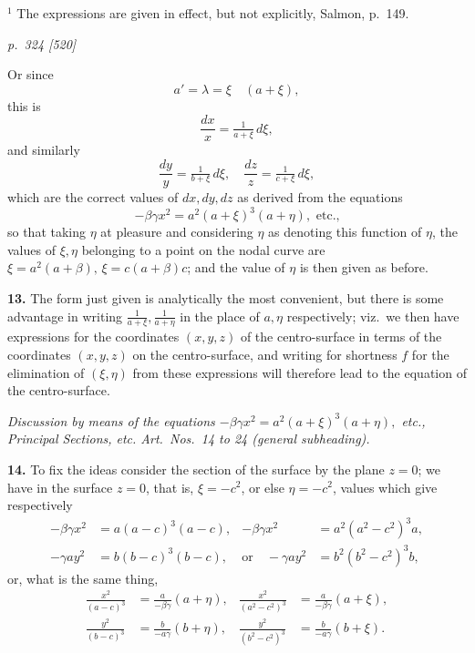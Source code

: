 \documentclass[11pt,a4paper]{article}
\theoremstyle{plain}
\theoremstyle{definition}
\begin{document}
\smallskip
\footnotesize
$^1$ The expressions are given in effect, but not explicitly, Salmon, p.~149.

\clearpage

\bigskip
\textit{p.~324 [520]}
\smallskip

Or since
\[
a' = \lambda = \xi\quad(a + \xi),
\]
this is
\[
\frac{dx}{x} = \tfrac{1}{a + \xi}\,d\xi,
\]
and similarly
\[
\frac{dy}{y} = \tfrac{1}{b + \xi}\,d\xi,\quad
\frac{dz}{z} = \tfrac{1}{c + \xi}\,d\xi,
\]
which are the correct values of $dx, dy, dz$ as derived from the equations
\[
-\beta\gamma x^2 = a^2(a + \xi)^3(a + \eta), \text{ etc.,}
\]
so that taking $\eta$ at pleasure and considering $\eta$ as denoting this function of $\eta$, the values of $\xi, \eta$ belonging to a point on the nodal curve are $\xi = a^2(a + \beta), \, \xi = c(a + \beta) c$; and the value of $\eta$ is then given as before.

\textbf{13.} The form just given is analytically the most convenient, but there is some advantage in writing $\tfrac{1}{a + \xi}, \tfrac{1}{a + \eta}$ in the place of $a, \eta$ respectively; viz.\ we then have expressions for the coordinates $(x, y, z)$ of the centro-surface in terms of the coordinates $(x, y, z)$ on the centro-surface, and writing for shortness $f$ for the elimination of $(\xi, \eta)$ from these expressions will therefore lead to the equation of the centro-surface.

\textit{Discussion by means of the equations $-\beta\gamma x^2 = a^2(a + \xi)^3(a + \eta),$ etc., Principal Sections, etc. Art.\ Nos.\ 14 to 24 (general subheading).}

\textbf{14.} To fix the ideas consider the section of the surface by the plane $z = 0$; we have in the surface $z = 0$, that is, $\xi = -c^2$, or else $\eta = -c^2$, values which give respectively
\begin{align*}
-\beta\gamma x^2 &= a(a - c)^3(a - c), & -\beta\gamma x^2 &= a^2(a^2 - c^2)^3 a,\\
-\gamma a y^2 &= b(b - c)^3(b - c), & \text{or}\quad -\gamma a y^2 &= b^2(b^2 - c^2)^3 b,
\end{align*}
or, what is the same thing,
\begin{align*}
\tfrac{x^2}{(a - c)^3} &= \tfrac{a}{-\beta\gamma}(a + \eta), & \tfrac{x^2}{(a^2 - c^2)^3} &= \tfrac{a}{-\beta\gamma}(a + \xi),\\
\tfrac{y^2}{(b - c)^3} &= \tfrac{b}{-a\gamma}(b + \eta), & \tfrac{y^2}{(b^2 - c^2)^3} &= \tfrac{b}{-a\gamma}(b + \xi).
\end{align*}
\end{document}
